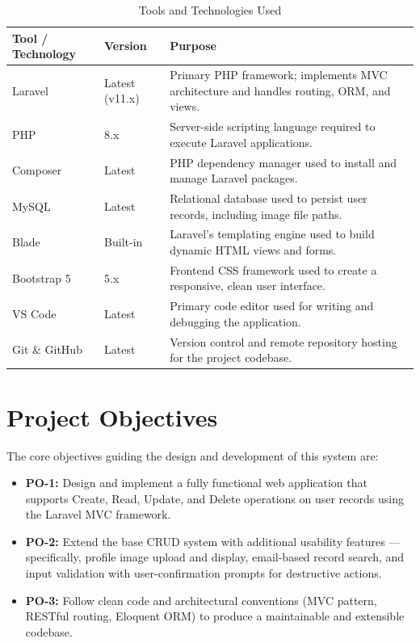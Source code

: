 \documentclass[12pt,a4paper]{report}
\begin{document}
\begin{table}[h!]
\centering
\caption{Tools and Technologies Used}
\label{tab:tools}
\renewcommand{\arraystretch}{1.3}
\begin{tabularx}{\textwidth}{@{}llX@{}}
\toprule
\textbf{Tool / Technology} & \textbf{Version} & \textbf{Purpose} \\
\midrule
Laravel       & Latest (v11.x)   & Primary PHP framework; implements MVC architecture and handles routing, ORM, and views. \\
PHP           & 8.x              & Server-side scripting language required to execute Laravel applications. \\
Composer      & Latest           & PHP dependency manager used to install and manage Laravel packages. \\
MySQL         & Latest           & Relational database used to persist user records, including image file paths. \\
Blade         & Built-in         & Laravel's templating engine used to build dynamic HTML views and forms. \\
Bootstrap 5   & 5.x              & Frontend CSS framework used to create a responsive, clean user interface. \\
VS Code       & Latest           & Primary code editor used for writing and debugging the application. \\
Git \& GitHub & Latest           & Version control and remote repository hosting for the project codebase. \\
\bottomrule
\end{tabularx}
\end{table}

\section{Project Objectives}

The core objectives guiding the design and development of this system are:

\begin{itemize}[leftmargin=1.5cm]
    \item \textbf{PO-1:} Design and implement a fully functional web application that
    supports Create, Read, Update, and Delete operations on user records using the
    Laravel MVC framework.

    \item \textbf{PO-2:} Extend the base CRUD system with additional usability features
    — specifically, profile image upload and display, email-based record search, and
    input validation with user-confirmation prompts for destructive actions.

    \item \textbf{PO-3:} Follow clean code and architectural conventions (MVC pattern,
    RESTful routing, Eloquent ORM) to produce a maintainable and extensible codebase.
\end{itemize}
\end{document}
